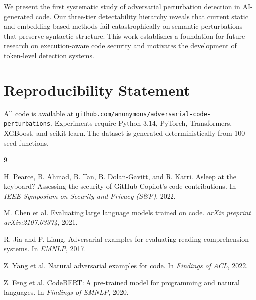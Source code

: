 \documentclass[11pt]{article}
\begin{document}
We present the first systematic study of adversarial perturbation detection in AI-generated code. Our three-tier detectability hierarchy reveals that current static and embedding-based methods fail catastrophically on semantic perturbations that preserve syntactic structure. This work establishes a foundation for future research on execution-aware code security and motivates the development of token-level detection systems.

\section*{Reproducibility Statement}

All code is available at \texttt{github.com/anonymous/adversarial-code-perturbations}. Experiments require Python 3.14, PyTorch, Transformers, XGBoost, and scikit-learn. The dataset is generated deterministically from 100 seed functions.


\begin{thebibliography}{9}

H. Pearce, B. Ahmad, B. Tan, B. Dolan-Gavitt, and R. Karri.
\newblock Asleep at the keyboard? Assessing the security of GitHub Copilot's code contributions.
\newblock In \textit{IEEE Symposium on Security and Privacy (S\&P)}, 2022.

M. Chen et al.
\newblock Evaluating large language models trained on code.
\newblock \textit{arXiv preprint arXiv:2107.03374}, 2021.

R. Jia and P. Liang.
\newblock Adversarial examples for evaluating reading comprehension systems.
\newblock In \textit{EMNLP}, 2017.

Z. Yang et al.
\newblock Natural adversarial examples for code.
\newblock In \textit{Findings of ACL}, 2022.

Z. Feng et al.
\newblock CodeBERT: A pre-trained model for programming and natural languages.
\newblock In \textit{Findings of EMNLP}, 2020.

\end{thebibliography}
\end{document}
